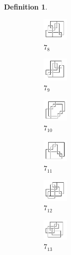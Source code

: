 \documentclass{article}
\theoremstyle{definition}
\newtheorem{defn}[thm]{Definition}
\theoremstyle{theorem}
\theoremstyle{proposition}
\theoremstyle{corollary}
\begin{document}
\begin{defn}
\begin{figure}[H]
    \begin{subfigure}{0.075\textwidth}
    \includegraphics[width=1.25cm]{../Midterm_Poster/grid_diagram/handcuff_7_8.png}
    \caption{$7_{8}$} 
    \end{subfigure}
    \begin{subfigure}{0.075\textwidth}
    \includegraphics[width=1.25cm]{../Midterm_Poster/grid_diagram/handcuff_7_9.png}
    \caption{$7_{9}$} 
    \end{subfigure}
    \begin{subfigure}{0.075\textwidth}
    \includegraphics[width=1.25cm]{../Midterm_Poster/grid_diagram/handcuff_7_10.png}
    \caption{$7_{10}$} 
    \end{subfigure}
    \begin{subfigure}{0.075\textwidth}
    \includegraphics[width=1.25cm]{../Midterm_Poster/grid_diagram/handcuff_7_11.png}
    \caption{$7_{11}$} 
    \end{subfigure}
    \begin{subfigure}{0.075\textwidth}
    \includegraphics[width=1.25cm]{../Midterm_Poster/grid_diagram/handcuff_7_12.png}
    \caption{$7_{12}$} 
    \end{subfigure}
    \begin{subfigure}{0.075\textwidth}
    \includegraphics[width=1.25cm]{../Midterm_Poster/grid_diagram/handcuff_7_13.png}
    \caption{$7_{13}$} 
    \end{subfigure}
    \begin{subfigure}{0.075\textwidth}

\end{subfigure}
\end{figure}
\end{defn}
\end{document}
